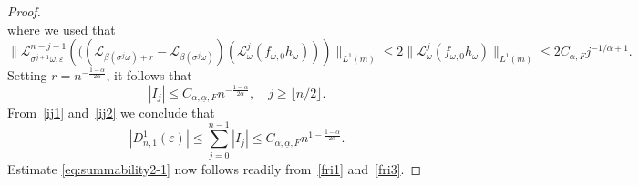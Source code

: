 \documentclass[12pt,reqno,a4paper]{article}
\newcommand{\ve}{\varepsilon}
\newcommand\bP{{\mathbb P}}
\begin{document}
\begin{proof}
\begin{equation}
	\end{equation}
	where we used that 
	\[
	\|\mathcal L_{\sigma^{j+1}\omega, \ve}^{n-j-1}\left (((\mathcal L_{\beta(\sigma^j \omega)+r}-\mathcal L_{\beta (\sigma^j \omega)})(\mathcal L_\omega^j (f_{\omega, 0}h_\omega))\right )\|_{L^1(m)}\le 2\|\mathcal L_\omega^j (f_{\omega, 0}h_\omega)\|_{L^1(m)}\le 2C_{\alpha, F}j^{-1/\alpha+1}.
	\]
	Setting $r=n^{-\frac{1-\alpha}{2\alpha}}$, it follows that
	\begin{equation}\label{ij2}
		|I_j| \le C_{\alpha, \underline{\alpha}, F} n^{-\frac{1-\alpha}{2\alpha}}, \quad j\ge \lfloor n/2\rfloor.
	\end{equation}
	From~\eqref{ij1} and~\eqref{ij2} we conclude that
	\begin{equation}\label{fri3}
		|D_{n,1}^1(\ve)|\le \sum_{j=0}^{n-1}|I_j| \le C_{\alpha, \underline{\alpha}, F}n^{1-\frac{1-\alpha}{2\alpha}}.
	\end{equation}
	Estimate \eqref{eq:summability2-1} now follows readily from~\eqref{fri1}  and~\eqref{fri3}.
\end{proof}

$$
$$
\end{document}
